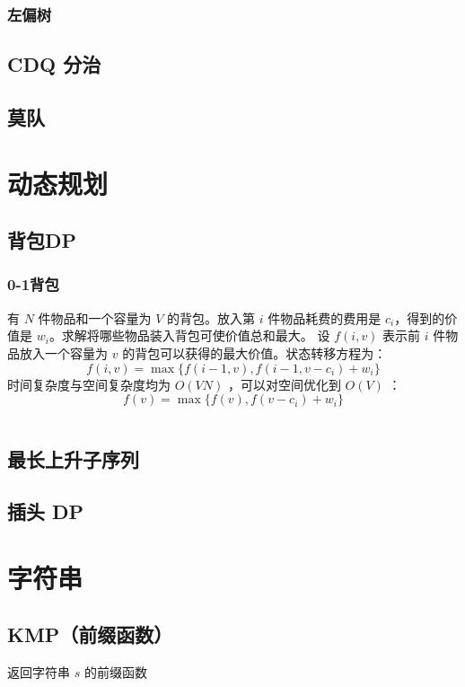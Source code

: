 \documentclass[a4paper, twoside]{article}
\begin{document}
    \subsubsection{左偏树}

\subsection{CDQ 分治}

\subsection{莫队}

\newpage
\section{动态规划}
\subsection{背包DP}
    \subsubsection{0-1背包}
    有 $N$ 件物品和一个容量为 $V$ 的背包。放入第 $i$ 件物品耗费的费用是 $c_i$，得到的价值是 $w_i$。求解将哪些物品装入背包可使价值总和最大。
    设 $f(i, v)$ 表示前 $i$ 件物品放入一个容量为 $v$ 的背包可以获得的最大价值。状态转移方程为：
    $$f(i, v)=\max\{f(i-1, v), f(i-1, v-c_i)+ w_i\}$$
    时间复杂度与空间复杂度均为 $O(VN)$ ，可以对空间优化到 $O(V)$ ：
    $$f(v)=\max\{f(v), f(v-c_i)+w_i\}$$
    \inputminted{cpp}{../src/动态规划/0-1背包.cpp}

\subsection{最长上升子序列}

\subsection{插头 DP}


\newpage
\section{字符串}
\subsection{KMP（前缀函数）}
返回字符串 $s$ 的前缀函数
\inputminted{cpp}{../src/字符串/KMP（前缀函数）.cpp}
\end{document}
